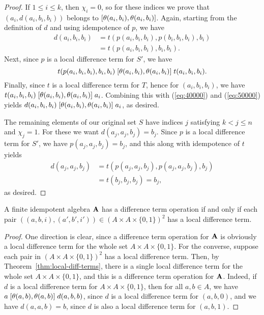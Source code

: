 \begin{proof}
If $1\leq i \leq k$, then $\chi_i =0$, so for these indices we prove
that $(a_i, d(a_i,b_i,b_i))$ belongs to $\mathrel{[\theta(a_i,b_i), \theta(a_i,b_i)]}$.
Again, starting from the definition of $d$ and using idempotence of $p$, we have
\begin{align}
  d(a_i,b_i,b_i) &=
  t(p(a_i,b_i,b_i), p(b_i,b_i,b_i), b_i)   \label{eq:40000}\\
  &=t(p(a_i,b_i,b_i), b_i, b_i). \nonumber
\end{align}
Next, since $p$ is a local difference term for $S'$, we have
\begin{equation}
  \label{eq:50000}
  t(p(a_i,b_i,b_i), b_i, b_i)
 \comm{\theta(a_i,b_i)}{\theta(a_i,b_i)}
 t(a_i, b_i, b_i).
\end{equation}
Finally, since $t$ is a local difference term for $T$, hence for
$(a_i, b_i, b_i)$,  %
we have 
$t(a_i, b_i, b_i) \mathrel{[\theta(a_i,b_i), \theta(a_i,b_i)]} a_i$.
Combining this with (\ref{eq:40000}) and (\ref{eq:50000}) yields
$d(a_i,b_i,b_i) \mathrel{[\theta(a_i,b_i), \theta(a_i,b_i)]} a_i$,
as desired.

The remaining elements of our original set $S$
have indices $j$ satisfying $k<j\leq n$ and $\chi_j = 1$.
For these we want $d(a_j,a_j,b_j) = b_j$.
Since $p$ is a local difference term for $S'$, we have
$p(a_j,a_j,b_j) = b_j$, and this along with idempotence of $t$ yields
\begin{align*}
d(a_j,a_j,b_j) &=
t(p(a_j,a_j,b_j), p(a_j,a_j,b_j), b_j)\\
&=t(b_j, b_j, b_j) =b_j,
\end{align*}
as desired.
\end{proof}

\begin{cor}
  \label{cor:loc-diff-term}
  A finite idempotent algebra $\mathbf{A}$ has a difference term operation if and
  only if each pair $((a,b,i), (a',b',i')) \in (A\times A \times \{0,1\})^2$ has a local
  difference term.
\end{cor}
\begin{proof}
  One direction is clear, since a difference term operation for $\mathbf{A}$ is
  obviously a local difference term for the whole set 
  $A\times A \times \{0,1\}$.
  For the converse, suppose
  each pair in $(A\times A \times \{0,1\})^2$ has a local
  difference term. Then, by Theorem~\ref{thm:local-diff-terms},
  there is a single local difference term for the whole set $A\times A \times \{0,1\}$,
  and this is a difference term operation for $\mathbf{A}$.  Indeed, if $d$ is a
  local difference term for $A\times A \times \{0,1\}$, then 
  for all $a, b \in A$, we have
  $a \mathrel{[\theta(a,b), \theta(a,b)]} d(a,b,b)$,
  since $d$ is a local difference term for $(a,b,0)$, and we have
  $d(a,a,b) = b$, since $d$ is also a local difference term for
  $(a,b,1)$.
\end{proof}

